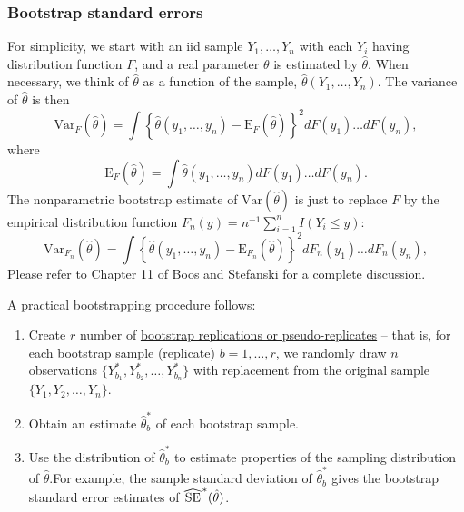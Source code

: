 \subsubsection*{Bootstrap standard errors}
For simplicity, we start with an iid sample $Y_1, \dots, Y_n$ with each $Y_i$ having distribution function $F$, and a real parameter $\theta$ is estimated by $\hat{\theta}$.
When necessary, we think of $\hat{\theta}$ as a function of the sample, $\hat{\theta}(Y_1, \dots, Y_n)$.
The variance of $\hat{\theta}$ is then
$$
\mbox{Var}_F(\hat{\theta}) = \int \left\{\hat{\theta}(y_1, \dots, y_n) - \mbox{E}_F(\hat{\theta})\right\}^2 dF(y_1) \dots dF(y_n),
$$
where 
$$
\mbox{E}_F(\hat{\theta}) = \int \hat{\theta}(y_1, \dots, y_n) dF(y_1) \dots dF(y_n).
$$
The nonparametric bootstrap estimate of $\mbox{Var}(\hat{\theta})$ is just to replace $F$ by the empirical distribution function $F_n(y) = n^{-1}\sum_{i = 1}^n I(Y_i \le y)$:
$$
\mbox{Var}_{F_n}(\hat{\theta}) = \int \left\{\hat{\theta}(y_1, \dots, y_n) - \mbox{E}_{F_n}(\hat{\theta})\right\}^2 dF_n(y_1) \dots dF_n(y_n),
$$
Please refer to Chapter 11 of Boos and Stefanski for a complete discussion.


A practical bootstrapping procedure follows:
\begin{enumerate}
	\item Create $r$  number of \underline{bootstrap replications or pseudo-replicates} -- that is, for each bootstrap sample (replicate) $b = 1, \dots, r$, we randomly draw $n$ observations $\{Y_{b_1}^*, Y_{b_2}^*, \dots, Y_{b_n}^*\}$ with replacement from the original sample $\{Y_1, Y_2, \dots, Y_n\}$.
	\item Obtain an estimate $\hat{\theta}_b^*$ of each bootstrap sample.
	\item Use the distribution of $\hat{\theta}_b^*$ to estimate properties of the sampling distribution of $\hat{\theta}$.For example,	the sample standard deviation of $\hat{\theta}_b^*$ gives the bootstrap standard error estimates of $\reallywidehat{SE}^*(\hat{\theta})$.
\end{enumerate}

